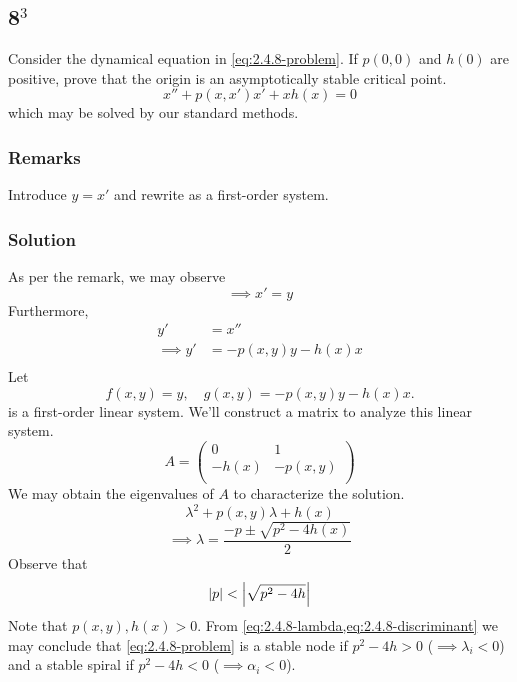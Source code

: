 \documentclass[12pt]{article}
\begin{document}
\newpage
\subsection{8$^3$}
Consider the dynamical equation in \cref{eq:2.4.8-problem}. If $p(0,0)$ and $h(0)$
are positive, prove that the origin is an asymptotically stable critical point.
\begin{equation}
  \label{eq:2.4.8-problem}
  x''+p(x,x')x' + xh(x) = 0
\end{equation}
which may be solved by our standard methods.
\subsubsection*{Remarks}
Introduce $y=x'$ and rewrite as a first-order system.

\subsubsection*{Solution}
As per the remark, we may observe
\begin{equation*}
  \implies x'=y
\end{equation*}
Furthermore,
\begin{equation*}
  \begin{aligned}
    y' &= x'' \\
    \implies y' &= -p(x,y)y - h(x)x \\
  \end{aligned}
\end{equation*}
Let
\begin{equation}
  \label{eq:2.5.8-let}
  f(x,y) = y,\quad g(x,y) = -p(x,y)y - h(x)x.
\end{equation}
 is a first-order linear system. We'll construct a matrix to
analyze this linear system.
\begin{equation*}
  A =
  \begin{pmatrix}
    0 & 1 \\ -h(x) & -p(x,y) \\
  \end{pmatrix}
\end{equation*}
We may obtain the eigenvalues of $A$ to characterize the solution.
$$\lambda^2 + p(x,y)\lambda + h(x)$$
\begin{equation}
  \label{eq:2.4.8-lambda}
  \implies \lambda = \frac{-p\pm\sqrt{p^2-4h(x)}}{2}
\end{equation}
Observe that
\begin{equation}
  \label{eq:2.4.8-discriminant}
  \left|{p}\right| < \left|{\sqrt{p^2-4h}}\right|
\end{equation}
Note that $p(x,y),h(x)>0$. From \cref{eq:2.4.8-lambda,eq:2.4.8-discriminant} we
may conclude that \cref{eq:2.4.8-problem} is a stable node if $p^2-4h>0$
($\implies \lambda_i<0$) and a stable spiral if $p^2-4h<0$ ($\implies\alpha_i<0$).
\end{document}
